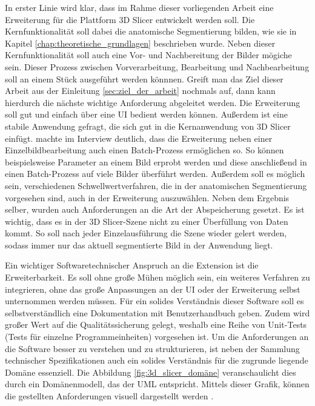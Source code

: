 In erster Linie wird klar, dass im Rahme dieser vorliegenden Arbeit eine Erweiterung
für die Plattform 3D Slicer entwickelt werden soll. Die Kernfunktionalität soll
dabei die anatomische Segmentierung bilden, wie sie in Kapitel \ref{chap:theoretische_grundlagen}
beschrieben wurde. Neben dieser Kernfunktionalität soll auch eine Vor- und Nachbereitung
der Bilder mögiche sein. Dieser Prozess zwischen Vorverarbeitung, Bearbeitung und
Nachbearbeitung soll an einem Stück ausgeführt werden könnnen. Greift man das
Ziel dieser Arbeit aus der Einleitung \ref{sec:ziel_der_arbeit} nochmals auf, dann
kann hierdurch die nächste wichtige Anforderung abgeleitet werden. Die
Erweiterung soll gut und einfach über eine \ac{UI} bedient werden können.
Außerdem ist eine stabile Anwendung gefragt, die sich gut in die Kernanwendung von
3D Slicer einfügt. \citet[]{walter2025} machte im Interview deutlich, dass die
Erweiterung neben einer Einzelbildbearbeitung auch einen Batch-Prozess
ermöglichen so. So können beispielsweise Parameter an einem Bild erprobt werden und
diese anschließend in einen Batch-Prozess auf viele Bilder überführt werden.
Außerdem soll es möglich sein, verschiedenen Schwellwertverfahren, die in der
anatomischen Segmentierung vorgesehen sind, auch in der Erweiterung auszuwählen.
Neben dem Ergebnis selber, wurden auch Anforderungen an die Art der Abspeicherung
gesetzt. Es ist wichtig, dass es in der 3D Slicer-Szene nicht zu einer Überfüllung
von Daten kommt. So soll nach jeder Einzelausführung die Szene wieder gelert
werden, sodass immer nur das aktuell segmentierte Bild in der Anwendung liegt.

Ein wichtiger Softwaretechnischer Anspruch an die Extension ist die Erweiterbarkeit.
Es soll ohne große Mühen möglich sein, ein weiteres Verfahren zu integrieren,
ohne das große Anpassungen an der UI oder der Erweiterung selbst unternommen
werden müssen. Für ein solides Verständnis dieser Software soll es selbstverständlich
eine Dokumentation mit Benutzerhandbuch geben. Zudem wird großer Wert auf die
Qualitätssicherung gelegt, weshalb eine Reihe von Unit-Tests (Tests für einzelne
Programmeinheiten) vorgesehen ist. Um die Anforderungen an die Software besser
zu verstehen und zu strukturieren, ist neben der Sammlung technischer Spezifikationen
auch ein solides Verständnis für die zugrunde liegende Domäne essenziell. Die
Abbildung \ref{fig:3d_slicer_domäne} veranschaulicht dies durch ein
Domänenmodell, das der \ac{UML} entspricht. Mittels dieser Grafik, können die
gestellten Anforderungen visuell dargestellt werden \citep[vgl.][]{walter2025}.


